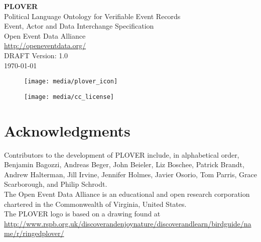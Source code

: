 \documentclass[11pt]{report}
\begin{document}

\vspace{-10pt}	

      \begin{center}
            {\Huge \bfseries PLOVER\ }\\[2ex]
            {\LARGE Political Language Ontology for Verifiable Event Records\\ [2ex]Event, Actor and Data Interchange Specification}\\[10ex]
            {\LARGE Open Event Data Alliance} \\[2ex]
            {\Large \url{http://openeventdata.org/} }\\[2ex]
            {\LARGE DRAFT Version: 1.0\\ [2EX]\monthyeardate\today}
        \end{center}


\begin{figure}[h!]
\centering
\texttt{[image: media/plover\_icon]}
\end{figure}

\vspace{20pt}	


\begin{figure}[h!]
\centering
\texttt{[image: media/cc\_license]}
\end{figure}






\chapter*{Acknowledgments}

\noindent Contributors to the development of PLOVER include, in alphabetical order, Benjamin Bagozzi, Andreas Beger, John Beieler, Liz Boschee, Patrick Brandt, Andrew Halterman, Jill Irvine, Jennifer Holmes, Javier Osorio, Tom Parris, Grace Scarborough, and Philip Schrodt.\\

\noindent The Open Event Data Alliance is an educational and open research corporation chartered in the Commonwealth of Virginia, United States.\\

\noindent The PLOVER logo is based on a drawing found at\\ {\footnotesize \url{http://www.rspb.org.uk/discoverandenjoynature/discoverandlearn/birdguide/name/r/ringedplover/}}\\
\end{document}
